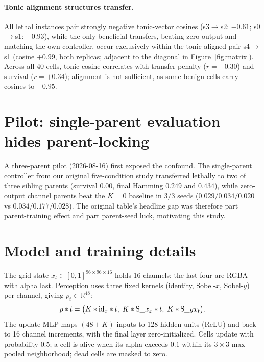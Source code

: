 \documentclass{article}
\begin{document}
\paragraph{Tonic alignment structures transfer.}
All lethal instances pair strongly negative tonic-vector cosines
(s3$\to$s2: $-0.61$; s0$\to$s1: $-0.93$), while the only beneficial
transfers, beating zero-output and matching the own controller, occur
exclusively within the tonic-aligned pair s4$\to$s1 (cosine
$+0.99$, both replicas; adjacent to the diagonal in
Figure~\ref{fig:matrix}). Across all 40 cells, tonic cosine correlates with transfer penalty
($r=-0.30$) and survival ($r=+0.34$); alignment is not sufficient, as
some benign cells carry cosines to $-0.95$.

\section{Pilot: single-parent evaluation hides parent-locking}
\label{app:pilot}

A three-parent pilot (2026-08-16) first exposed the confound. The
single-parent controller from our original five-condition study
transferred lethally to two of three sibling parents (survival $0.00$,
final Hamming $0.249$ and $0.434$), while zero-output channel parents beat
the $K{=}0$ baseline in $3/3$ seeds ($0.029/0.034/0.020$ vs
$0.034/0.177/0.028$). The original table's headline gap was therefore part
parent-training effect and part parent-seed luck, motivating this study.

\section{Model and training details}
\label{app:model}

The grid state $x_t \in [0,1]^{96 \times 96 \times 16}$ holds 16 channels;
the last four are RGBA with alpha last. Perception uses three fixed kernels
(identity, Sobel-$x$, Sobel-$y$) per channel, giving
$p_t \in \mathbb{R}^{48}$:
\begin{equation}
p*t = \big(K*{\mathrm{id}} _ x*t,\; K*{\mathrm{S}\_x} _ x*t,\;
K*{\mathrm{S}\_y} \* x_t\big).
\end{equation}
The update MLP maps $(48{+}K)$ inputs to 128 hidden units (ReLU) and back to
16 channel increments, with the final layer zero-initialized. Cells update
with probability $0.5$; a cell is alive when its alpha exceeds $0.1$ within
its $3{\times}3$ max-pooled neighborhood; dead cells are masked to zero.
\end{document}
